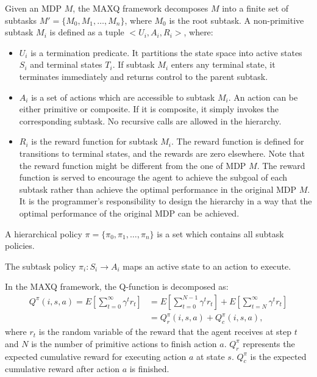 \begin{definition}
    Given an MDP $M$, the MAXQ framework decomposes $M$ into a finite
    set of subtasks $M' = \{M_0, M_1, \dots, M_n\}$, where $M_0$ is the root subtask. 
    A non-primitive subtask $M_i$ is defined as a tuple $<U_i, A_i, R_i>$, where:
    \begin{itemize}
    \item $U_i$ is a termination predicate. It partitions the state space into active states $S_i$ and
                terminal states $T_i$. If subtask $M_i$ enters any terminal state, it terminates immediately
                and returns control to the parent subtask. 
    \item $A_i$ is a set of actions which are accessible to subtask $M_i$. An action can be either primitive or composite.
                If it is composite, it simply invokes the corresponding subtask. No recursive calls 
                are allowed in the hierarchy.
    \item $R_i$ is the reward function for subtask $M_i$. The reward function is defined for transitions to terminal states, and the rewards are zero elsewhere. Note
        that the reward function might be different from the one of MDP $M$. The reward function is served to encourage the agent to achieve 
        the subgoal of each subtask rather than achieve the optimal performance in the original MDP $M$. It is the programmer's responsibility
        to design the hierarchy in a way that the optimal performance of the original MDP can be achieved.
    \end{itemize}
\end{definition}

\begin{definition}
A hierarchical policy $\pi = \{\pi_0, \pi_1, \dots, \pi_n\}$ is a set which contains all subtask policies. 
\end{definition}
The subtask policy $\pi_i: S_i \rightarrow A_i$ maps an active state to an action to execute.


In the MAXQ framework, the Q-function is decomposed as:
\begin{align}
    Q^{\pi}(i, s, a) = E[\sum_{t=0}^{\infty}\gamma^t r_t] &= E[\sum_{t=0}^{N - 1}\gamma^t r_t] + E[\sum_{t=N}^{\infty}\gamma^t r_t]\\
                    &= Q_r^{\pi}(i, s, a) + Q_c^{\pi}(i, s, a),
\end{align}
where $r_t$ is the random variable of the reward that the agent receives at step $t$ and $N$ is the number of primitive actions to finish action $a$.
$ Q_r^{\pi}$ represents the expected cumulative reward for executing action $a$ at state $s$.
$Q_c^{\pi}$ is the expected cumulative reward after action $a$ is finished.


